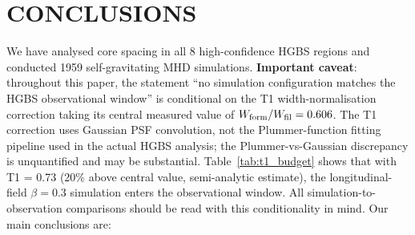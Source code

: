 \documentclass[twoside,twocolumn]{mnras}
\begin{document}
\section{CONCLUSIONS}

We have analysed core spacing in all 8 high-confidence HGBS regions and conducted
1959 self-gravitating MHD simulations. \textbf{Important caveat}: throughout this
paper, the statement ``no simulation configuration matches the HGBS observational
window'' is conditional on the T1 width-normalisation correction taking its central
measured value of $W_{\rm form}/W_{\rm fil} = 0.606$. The T1 correction uses Gaussian
PSF convolution, not the Plummer-function fitting pipeline used in the actual HGBS
analysis; the Plummer-vs-Gaussian discrepancy is unquantified and may be substantial.
Table~\ref{tab:t1_budget} shows that with T1 = 0.73 (20\% above central value, semi-analytic estimate), the longitudinal-field $\beta = 0.3$ simulation enters the observational window. All
simulation-to-observation comparisons should be read with this conditionality in mind.
Our main conclusions are:
\end{document}
